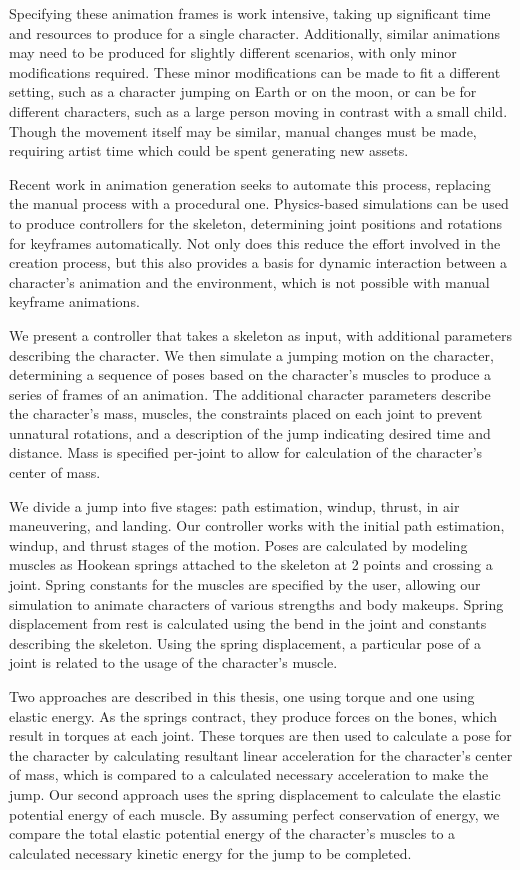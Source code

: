 Specifying these animation frames is work intensive, taking up significant time and resources to produce for a single character.  Additionally, similar animations may need to be produced for slightly different scenarios, with only minor modifications required.  These minor modifications can be made to fit a different setting, such as a character jumping on Earth or on the moon, or can be for different characters, such as a large person moving in contrast with a small child.  Though the movement itself may be similar, manual changes must be made, requiring artist time which could be spent generating new assets.  

Recent work in animation generation seeks to automate this process, replacing the manual process with a procedural one.  Physics-based simulations can be used to produce controllers for the skeleton, determining joint positions and rotations for keyframes automatically.  Not only does this reduce the effort involved in the creation process, but this also provides a basis for dynamic interaction between a character's animation and the environment, which is not possible with manual keyframe animations.

We present a controller that takes a skeleton as input, with additional parameters describing the character.  We then simulate a jumping motion on the character, determining a sequence of poses based on the character's muscles to produce a series of frames of an animation.  The additional character parameters describe the character's mass, muscles, the constraints placed on each joint to prevent unnatural rotations, and a description of the jump indicating desired time and distance.  Mass is specified per-joint to allow for calculation of the character's center of mass.  

We divide a jump into five stages: path estimation, windup, thrust, in air maneuvering, and landing. Our controller works with the initial path estimation, windup, and thrust stages of the motion.  Poses are  calculated by modeling muscles as Hookean springs attached to the skeleton at 2 points and crossing a joint. Spring constants for the muscles are specified by the user, allowing our simulation to animate characters of various strengths and body makeups.  Spring displacement from rest is calculated using the bend in the joint and constants describing the skeleton.  Using the spring displacement, a particular pose of a joint is related to the usage of the character's muscle.

Two approaches are described in this thesis, one using torque and one using elastic energy.  As the springs contract, they produce forces on the bones, which result in torques at each joint.  These torques are then used to calculate a pose for the character by calculating resultant linear acceleration for the character's center of mass, which is compared to a calculated necessary acceleration to make the jump.  Our second approach uses the spring displacement to calculate the elastic potential energy of each muscle.  By assuming perfect conservation of energy, we compare the total elastic potential energy of the character's muscles to a calculated necessary kinetic energy for the jump to be completed.

